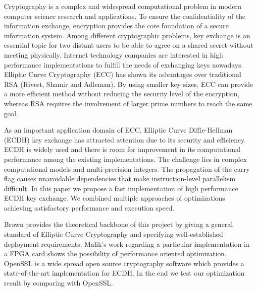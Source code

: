 Cryptography is a complex and widespread computational problem in modern computer science research and applications. To ensure the confidentiality of the information exchange, encryption provides the core foundation of a secure information system. Among different cryptographic problems, key exchange is an essential topic for two distant users to be able to agree on a shared secret without meeting physically. Internet technology companies are interested in high performance implementations to fulfill the needs of exchanging keys nowadays. Elliptic Curve Cryptography (ECC) has shown its advantages over traditional RSA (Rivest, Shamir and Adleman). By using smaller key sizes, ECC can provide a more efficient method without reducing the security level of the encryption, whereas RSA requires the involvement of larger prime numbers to reach the same goal\cite{Malik:2010}.

As an important application domain of ECC, Elliptic Curve Diffie-Hellman (ECDH) key exchange has attracted attention due to its security and efficiency. ECDH is widely used and there is room for improvement in its computational performance among the existing implementations. The challenge lies in complex computational models and multi-preci\-sion integers. The propagation of the carry flag causes unavoidable dependencies that make instruction-level parallelism difficult. In this paper we propose a fast implementation of high performance ECDH key exchange. We combined multiple approaches of optimizations achieving satisfactory performance and execution speed.

Brown\cite{Brown:2009}  provides the theoretical backbone of this project by giving a general standard of Elliptic Curve Cryptography and specifying well-established deployment requirements\cite{Brown:2010}. Malik's work regarding a particular implementation in a FPGA card\cite{Malik:2010} shows the possibility of performance oriented optimization. OpenSSL is a wide spread open source cryptography software which provides a state-of-the-art implementation for ECDH\cite{Emilia:2011}. In the end we test our optimization result by comparing with OpenSSL.